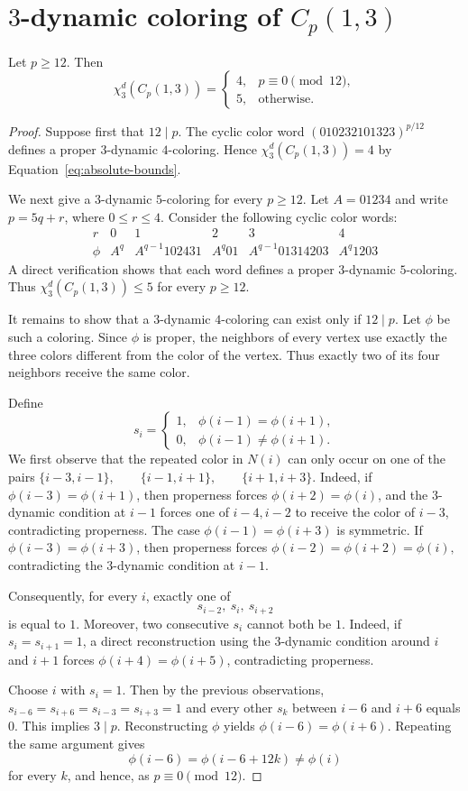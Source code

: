 \section{$3$-dynamic coloring of $C_p(1,3)$}

\begin{theorem}\label{thm:circulant-r3}
Let $p\ge12$. Then
\[
\chi_3^d(C_p(1,3))=
\begin{cases}
4, & p\equiv0\pmod{12},\\
5, & \text{otherwise}.
\end{cases}
\]
\end{theorem}

\begin{proof}
Suppose first that $12\mid p$. The cyclic color word
$
(010232101323)^{p/12}
$
defines a proper $3$-dynamic $4$-coloring. Hence
$\chi_3^d(C_p(1,3))=4$ by
Equation~\ref{eq:absolute-bounds}.

We next give a $3$-dynamic $5$-coloring for every $p\ge12$.
Let $A=01234$ and write $p=5q+r$, where $0\le r\le4$.
Consider the following cyclic color words:
\[
\begin{array}{c|ccccc}
r&0&1&2&3&4\\ \hline
\phi&
A^q&
A^{q-1}102431&
A^q01&
A^{q-1}01314203&
A^q1203
\end{array}
\]
A direct verification shows that each word defines a proper
$3$-dynamic $5$-coloring. Thus
$
\chi_3^d(C_p(1,3))\le5
$
for every $p\ge12$.

It remains to show that a $3$-dynamic $4$-coloring can exist only if
$12\mid p$. Let $\phi$ be such a coloring. Since $\phi$ is proper,
the neighbors of every vertex use exactly the three colors different
from the color of the vertex. Thus exactly two of its four neighbors
receive the same color.

Define
\[
s_i=
\begin{cases}
1,&\phi(i-1)=\phi(i+1),\\
0,&\phi(i-1)\neq\phi(i+1).
\end{cases}
\]
We first observe that the repeated color in $N(i)$ can only occur on
one of the pairs
$
\{i-3,i-1\},\qquad
\{i-1,i+1\},\qquad
\{i+1,i+3\}.
$
Indeed, if $\phi(i-3)=\phi(i+1)$, then properness forces
$\phi(i+2)=\phi(i)$, and the $3$-dynamic condition at $i-1$ forces
one of $i-4,i-2$ to receive the color of $i-3$, contradicting
properness. The case $\phi(i-1)=\phi(i+3)$ is symmetric. If
$\phi(i-3)=\phi(i+3)$, then properness forces
$
\phi(i-2)=\phi(i+2)=\phi(i),
$
contradicting the $3$-dynamic condition at $i-1$.

Consequently, for every $i$, exactly one of
\[
s_{i-2},\ s_i,\ s_{i+2}
\]
is equal to $1$. Moreover, two consecutive $s_i$ cannot both be $1$.
Indeed, if $s_i=s_{i+1}=1$, a direct reconstruction using the
$3$-dynamic condition around $i$ and $i+1$ forces
$\phi(i+4)=\phi(i+5)$, contradicting properness.

Choose $i$ with $s_i=1$. Then by the previous
observations, $s_{i-6}=s_{i+6}=s_{i-3}=s_{i+3}=1$ and every other $s_k$ between $i-6$ and $i+6$ equals 0.
This implies $3\mid p$.
Reconstructing $\phi$ yields
$\phi(i-6)=\phi(i+6)$.
Repeating the same argument gives
\[
\phi(i-6)=\phi(i-6+12k) \neq \phi(i)
\]
for every $k$, and hence, as $p\equiv0\pmod {12}$.
\end{proof}